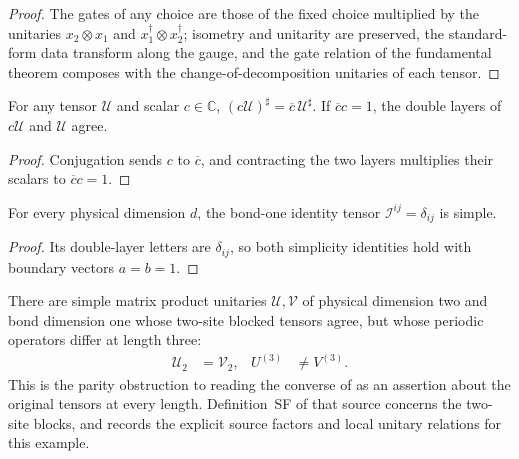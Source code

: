 \begin{proof}
    \leanok
    The gates of any choice are those of the fixed choice multiplied by the
    unitaries $x_2\otimes x_1$ and $x_1^\dagger\otimes x_2^\dagger$; isometry and
    unitarity are preserved, the standard-form data transform along the gauge,
    and the gate relation of the fundamental theorem composes with the
    change-of-decomposition unitaries of each tensor.
\end{proof}

\begin{lemma}
    \label{thm:mpu_double_layer_scalar_invariance}
    \leanok
    For any tensor $\mathcal U$ and scalar $c\in\mathbb C$,
    $(c\mathcal U)^\sharp=\overline c\,\mathcal U^\sharp$.
    If $\overline c c=1$, the double layers of $c\mathcal U$ and
    $\mathcal U$ agree.
\end{lemma}
\begin{proof}\leanok
    Conjugation sends $c$ to $\overline c$, and contracting the two
    layers multiplies their scalars to $\overline c c=1$.
\end{proof}

\begin{lemma}
    \label{thm:mpu_identity_tensor_simple}
    \leanok
    For every physical dimension $d$, the bond-one identity tensor
    $\mathcal I^{ij}=\delta_{ij}$ is simple.
\end{lemma}
\begin{proof}\leanok
    Its double-layer letters are $\delta_{ij}$, so both simplicity
    identities hold with boundary vectors $a=b=1$.
\end{proof}

\begin{lemma}
    \label{thm:mpu_standard_form_parity_obstruction}
    \leanok
    There are simple matrix product unitaries $\mathcal U,\mathcal V$ of
    physical dimension two and bond dimension one whose two-site blocked
    tensors agree, but whose periodic operators differ at length three:
    \begin{align}
        \mathcal U_2 & =\mathcal V_2, & U^{(3)} & \ne V^{(3)}.
    \end{align}
    This is the parity obstruction to reading the converse of
    \cite[Theorem~FundamentalMPU, lines~624--648]{Cirac2017MPU} as an
    assertion about the original tensors at every length. Definition~SF of
    that source concerns the two-site blocks, and \cite{gap:mpu_standard_form_parity_gap} records the explicit source factors
    and local unitary relations for this
    example.
\end{lemma}

